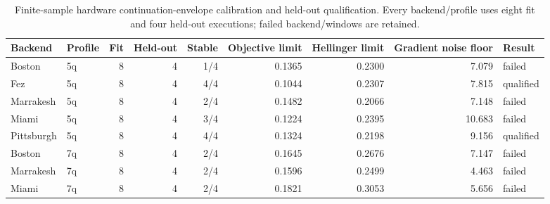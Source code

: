 \begin{table}[t]
\centering
\small
\caption{Finite-sample hardware continuation-envelope calibration and held-out qualification. Every backend/profile uses eight fit and four held-out executions; failed backend/windows are retained.}
\label{tab:hardware-qualification-details}
\begin{tabular}{@{}llrrrrrrl@{}}
\toprule
\textbf{Backend} & \textbf{Profile} & \textbf{Fit} & \textbf{Held-out} & \textbf{Stable} & \textbf{Objective limit} & \textbf{Hellinger limit} & \textbf{Gradient noise floor} & \textbf{Result} \\
\midrule
Boston & 5q & 8 & 4 & 1/4 & 0.1365 & 0.2300 & 7.079 & failed \\
Fez & 5q & 8 & 4 & 4/4 & 0.1044 & 0.2307 & 7.815 & qualified \\
Marrakesh & 5q & 8 & 4 & 2/4 & 0.1482 & 0.2066 & 7.148 & failed \\
Miami & 5q & 8 & 4 & 3/4 & 0.1224 & 0.2395 & 10.683 & failed \\
Pittsburgh & 5q & 8 & 4 & 4/4 & 0.1324 & 0.2198 & 9.156 & qualified \\
Boston & 7q & 8 & 4 & 2/4 & 0.1645 & 0.2676 & 7.147 & failed \\
Marrakesh & 7q & 8 & 4 & 2/4 & 0.1596 & 0.2499 & 4.463 & failed \\
Miami & 7q & 8 & 4 & 2/4 & 0.1821 & 0.3053 & 5.656 & failed \\
\bottomrule
\end{tabular}
\end{table}

